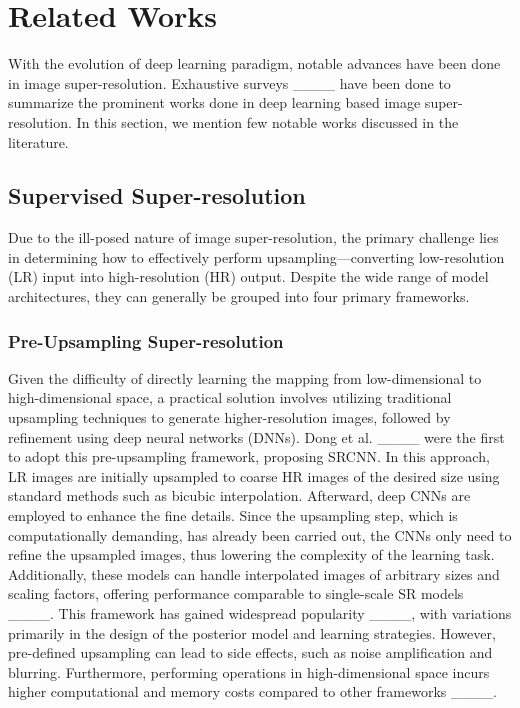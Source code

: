\section{Related Works}
With the evolution of deep learning paradigm, notable advances have been done in image super-resolution. Exhaustive surveys ____ have been done to summarize the prominent works done in deep learning based image super-resolution. In this section, we mention few notable works discussed in the literature.

\subsection{Supervised Super-resolution}
Due to the ill-posed nature of image super-resolution, the primary challenge lies in determining how to effectively perform upsampling—converting low-resolution (LR) input into high-resolution (HR) output. Despite the wide range of model architectures, they can generally be grouped into four primary frameworks.

\subsubsection{Pre-Upsampling Super-resolution}
Given the difficulty of directly learning the mapping from low-dimensional to high-dimensional space, a practical solution involves utilizing traditional upsampling techniques to generate higher-resolution images, followed by refinement using deep neural networks (DNNs). Dong et al. ____ were the first to adopt this pre-upsampling framework, proposing SRCNN. In this approach, LR images are initially upsampled to coarse HR images of the desired size using standard methods such as bicubic interpolation. Afterward, deep CNNs are employed to enhance the fine details. Since the upsampling step, which is computationally demanding, has already been carried out, the CNNs only need to refine the upsampled images, thus lowering the complexity of the learning task. Additionally, these models can handle interpolated images of arbitrary sizes and scaling factors, offering performance comparable to single-scale SR models ____. This framework has gained widespread popularity ____, with variations primarily in the design of the posterior model and learning strategies. However, pre-defined upsampling can lead to side effects, such as noise amplification and blurring. Furthermore, performing operations in high-dimensional space incurs higher computational and memory costs compared to other frameworks ____.


